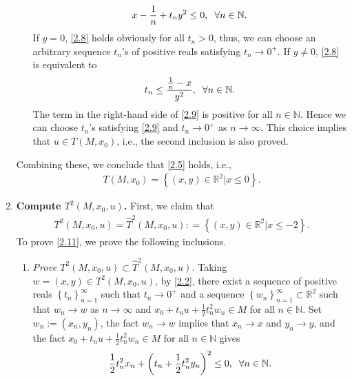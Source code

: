\documentclass[a4paper]{article}
\numberwithin{equation}{section}
\begin{document}
\begin{enumerate}
\begin{enumerate}
\begin{align}
\label{2.8}
x - \frac{1}{n} + {t_n}{y^2} \le 0,\hspace{0.2cm}\forall n \in \mathbb{N}.
\end{align}
If $y=0$, \eqref{2.8} holds obviously for all $t_n>0$, thus, we can choose an arbitrary sequence $t_n$'s of positive reals satisfying $t_n\to 0^+$. If $y\ne 0$, \eqref{2.8} is equivalent to
\begin{align}
\label{2.9}
{t_n} \le \frac{{\frac{1}{n} - x}}{{{y^2}}}, \hspace{0.2cm}\forall n \in \mathbb{N}.
\end{align}
The term in the right-hand side of \eqref{2.9} is positive for all $n\in \mathbb{N}$. Hence we can  choose $t_n$'s satisfying \eqref{2.9} and $t_n\to 0^+$ as $n\to \infty$. This choice implies that $u\in T\left(M,x_0\right)$, i.e., the second inclusion is also proved.
\end{enumerate}
Combining these, we conclude that \eqref{2.5} holds, i.e.,
\begin{align}
T\left( {M,{x_0}} \right) = \left\{ {\left( {x,y} \right) \in {\mathbb{R}^2}|x \le 0} \right\}.
\end{align}
\item \textbf{Compute ${T^2}\left( {M,{x_0},u} \right)$.} First, we claim that
\begin{align}
\label{2.11}
{T^2}\left( {M,{x_0},u} \right) = {\widehat T^2}\left( {M,{x_0},u} \right): = \left\{ {\left( {x,y} \right) \in {\mathbb{R}^2}|x \le  - 2} \right\}.
\end{align}
To prove \eqref{2.11}, we prove the following inclusions.
\begin{enumerate}
\item \textit{Prove ${T^2}\left( {M,{x_0},u} \right) \subset {\widehat T^2}\left( {M,{x_0},u} \right)$.} Taking $w=\left(x,y\right) \in T^2 \left(M,x_0,u\right)$, by \eqref{2.2}, there exist a sequence of positive reals $\left\{ {{t_n}} \right\}_{n = 1}^\infty $ such that $t_n\to 0^+$ and a sequence $\left\{ {{w_n}} \right\}_{n = 1}^\infty  \subset {\mathbb{R}^2}$ such that $w_n\to w$ as $n\to \infty$ and ${x_0} + {t_n}u + \frac{1}{2}t_n^2{w_n} \in M$ for all $n\in \mathbb{N}$. Set $w_n:=\left(x_n,y_n\right)$, the fact $w_n\to w$ implies that $x_n\to x$ and $y_n\to y$, and the fact ${x_0} + {t_n}u + \frac{1}{2}t_n^2{w_n} \in M$ for all $n\in \mathbb{N}$ gives
\begin{align}
\label{2.12}
\frac{1}{2}t_n^2{x_n} + {\left( {{t_n} + \frac{1}{2}t_n^2{y_n}} \right)^2} \le 0,\hspace{0.2cm}\forall n \in \mathbb{N}.

\end{align}
\end{enumerate}
\end{enumerate}
\end{document}
